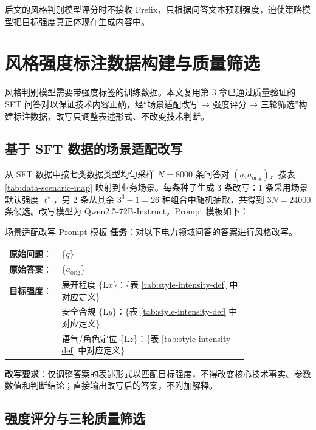 \documentclass[fontset=fandol,type=master,campus=shenzhen,etitleauto=true]{hithesisbook}
\begin{document}
后文的风格判别模型评分时不接收 Prefix，只根据问答文本预测强度，迫使策略模型把目标强度真正体现在生成内容中。

\section{风格强度标注数据构建与质量筛选}\label{ux98ceux683cux504fux597dux6570ux636eux6784ux5efaux4e0e-llm-as-judge-ux7b5bux9009}

风格判别模型需要带强度标签的训练数据。本文复用第 3 章已通过质量验证的 SFT 问答对以保证技术内容正确，经“场景适配改写 → 强度评分 → 三轮筛选”构建标注数据，改写只调整表述形式、不改变技术判断。

\subsection{基于 SFT 数据的场景适配改写}\label{ux57faux4e8e-sft-ux6570ux636eux7684ux573aux666fux9002ux914dux6539ux5199}

从 SFT 数据中按七类数据类型均匀采样 $N = 8000$ 条问答对 $(q, a_{\text{orig}})$，按表 \ref{tab:data-scenario-map} 映射到业务场景。每条种子生成 3 条改写：1 条采用场景默认强度 $\boldsymbol{\ell}^{s}$，另 2 条从其余 $3^3 - 1 = 26$ 种组合中随机抽取，共得到 $3N = 24000$ 条候选。改写模型为 Qwen2.5-72B-Instruct，Prompt 模板如下：

\begin{promptbox}{场景适配改写 Prompt 模板}
\textbf{任务}：对以下电力领域问答的答案进行风格改写。\par\smallskip
\begin{tabular}{@{}l@{\;}p{0.78\linewidth}@{}}
\textbf{原始问题}： & \{$q$\} \\
\textbf{原始答案}： & \{$a_{\text{orig}}$\} \\
\textbf{目标强度}： & 展开程度 \{L$x$\}：\{表 \ref{tab:style-intensity-def} 中对应定义\} \\
 & 安全合规 \{L$y$\}：\{表 \ref{tab:style-intensity-def} 中对应定义\} \\
 & 语气/角色定位 \{L$z$\}：\{表 \ref{tab:style-intensity-def} 中对应定义\} \\
\end{tabular}\par\smallskip
\textbf{改写要求}：仅调整答案的表述形式以匹配目标强度，不得改变核心技术事实、参数数值和判断结论；直接输出改写后的答案，不附加解释。
\end{promptbox}

\subsection{强度评分与三轮质量筛选}\label{ux4e09ux8f6eux8d28ux91cfux7b5bux9009}
\end{document}
